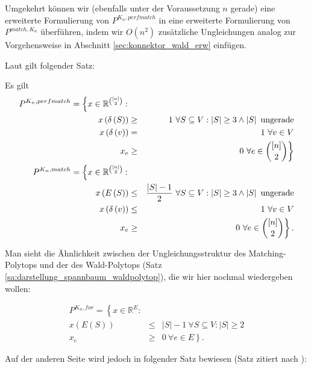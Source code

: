 \documentclass[10p,a4paper,BCOR = 12mm, DIV=15]{scrbook}
\begin{document}
{Umgekehrt können wir (ebenfalls unter der Voraussetzung $n$ gerade) eine erweiterte Formulierung von $P^{K_n, perfmatch}$ in eine erweiterte Formulierung von $P^{match, K_n}$ überführen, indem wir $O\left(n^2\right)$ zusätzliche Ungleichungen analog zur Vorgehensweise in Abschnitt \ref{sec:konnektor_wald_erw} einfügen.

Laut \citep{schrijver2003combinatorial} gilt folgender Satz:

\begin{Sa}
Es gilt
\begin{eqnarray*}
P^{K_n, perfmatch} = \left\{ x \in \mathbb{R}^{\left[n\right] \choose 2}: \right. \\
x\left(\delta\left(S\right)\right) & \geq & 1\ \forall S \subseteq V: \left|S\right| \geq 3 \wedge \left|S\right| \textnormal{ ungerade} \\
x\left(\delta\left(v\right)\right) & = & 1\ \forall v \in V \\
x_e & \geq & \left.0 \ \forall e \in {\left[n\right] \choose 2}\right\} \\
P^{K_n, match} = \left\{ x \in \mathbb{R}^{\left[n\right] \choose 2}: \right. \\
x\left(E\left(S\right)\right) & \leq & \frac{\left|S\right| - 1}{2}\ \forall S \subseteq V: \left|S\right| \geq 3 \wedge \left|S\right| \textnormal{ ungerade} \\
x\left(\delta\left(v\right)\right) & \leq & 1\ \forall v \in V \\
x_e & \geq & \left.0 \ \forall e \in {\left[n\right] \choose 2}\right\}.
\end{eqnarray*}
\end{Sa}

Man sieht die Ähnlichkeit zwischen der Ungleichungsstruktur des Matching-Poly\-tops und der des Wald-Polytops (Satz \ref{sa:darstellung_spannbaum_waldpolytop}), die wir hier nochmal wiedergeben wollen:

\begin{eqnarray*}
P^{K_n, for} =  \left\{ x \in \mathbb{R}^E: \right. & & \nonumber \\
x\left(E\left(S\right)\right) & \leq & \left|S\right|-1\ \forall S \subseteq V: \left|S\right| \geq 2 \\
x_e & \geq & \left. 0\ \forall e \in E \right\}. \nonumber
\end{eqnarray*}

Auf der anderen Seite wird jedoch in \cite{yannakakis:comb_lin} folgender Satz bewiesen (Satz zitiert nach \cite{optima:ext_form_comb_opt}):

}
\end{document}
